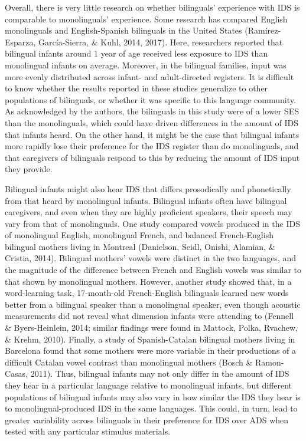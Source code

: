 \documentclass[
  english,
  ,man,floatsintext]{apa6}
\begin{document}
Overall, there is very little research on whether bilinguals' experience with IDS is comparable to monolinguals' experience. Some research has compared English monolinguals and English-Spanish bilinguals in the United States (Ramírez-Esparza, García-Sierra, \& Kuhl, 2014, 2017). Here, researchers reported that bilingual infants around 1 year of age received less exposure to IDS than monolingual infants on average. Moreover, in the bilingual families, input was more evenly distributed across infant- and adult-directed registers. It is difficult to know whether the results reported in these studies generalize to other populations of bilinguals, or whether it was specific to this language community. As acknowledged by the authors, the bilinguals in this study were of a lower SES than the monolinguals, which could have driven differences in the amount of IDS that infants heard. On the other hand, it might be the case that bilingual infants more rapidly lose their preference for the IDS register than do monolinguals, and that caregivers of bilinguals respond to this by reducing the amount of IDS input they provide.

Bilingual infants might also hear IDS that differs prosodically and phonetically from that heard by monolingual infants. Bilingual infants often have bilingual caregivers, and even when they are highly proficient speakers, their speech may vary from that of monolinguals. One study compared vowels produced in the IDS of monolingual English, monolingual French, and balanced French-English bilingual mothers living in Montreal (Danielson, Seidl, Onishi, Alamian, \& Cristia, 2014). Bilingual mothers' vowels were distinct in the two languages, and the magnitude of the difference between French and English vowels was similar to that shown by monolingual mothers. However, another study showed that, in a word-learning task, 17-month-old French-English bilinguals learned new words better from a bilingual speaker than a monolingual speaker, even though acoustic measurements did not reveal what dimension infants were attending to (Fennell \& Byers-Heinlein, 2014; similar findings were found in Mattock, Polka, Rvachew, \& Krehm, 2010). Finally, a study of Spanish-Catalan bilingual mothers living in Barcelona found that some mothers were more variable in their productions of a difficult Catalan vowel contrast than monolingual mothers (Bosch \& Ramon-Casas, 2011). Thus, bilingual infants may not only differ in the amount of IDS they hear in a particular language relative to monolingual infants, but different populations of bilingual infants may also vary in how similar the IDS they hear is to monolingual-produced IDS in the same languages. This could, in turn, lead to greater variability across bilinguals in their preference for IDS over ADS when tested with any particular stimulus materials.
\end{document}
